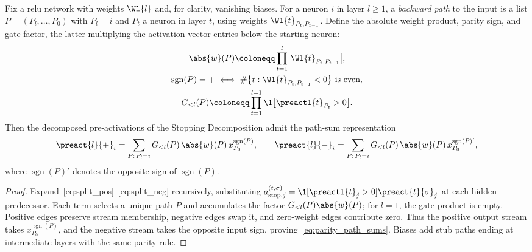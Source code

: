 \begin{lemmaenv}\label{lem:parity_path}
Fix a \ac{relu} network with weights $\Wl{l}$ and, for clarity, vanishing biases. For a neuron $i$ in layer $l \ge 1$, a \emph{backward path} to the input is a list $P = (P_l, \dots, P_0)$ with $P_l = i$ and $P_t$ a neuron in layer $t$, using weights $\Wl{t}_{P_t, P_{t-1}}$. Define the absolute weight product, parity sign, and gate factor, the latter multiplying the activation-vector entries below the starting neuron:
\begin{equation*}
\begin{gathered}
	\abs{w}(P) \coloneqq \prod_{t=1}^{l} \bigl|\Wl{t}_{P_t, P_{t-1}}\bigr|,
\\
\operatorname{sgn}(P) = + \iff \#\bigl\{ t : \Wl{t}_{P_t, P_{t-1}} < 0 \bigr\}
    \text{ is even},
\\
	G_{<l}(P) \coloneqq \prod_{t=1}^{l-1} \1\bigl[\preactl{t}_{P_t} > 0\bigr].
\end{gathered}
\end{equation*}
Then the decomposed pre-activations of the Stopping Decomposition admit the path-sum representation
\begin{equation}
	\preact{l}{+}_i = \sum_{P :\, P_l = i} G_{<l}(P)\, \abs{w}(P)\, x_{P_0}^{\operatorname{sgn}(P)},
	\qquad
	\preact{l}{-}_i = \sum_{P :\, P_l = i} G_{<l}(P)\, \abs{w}(P)\, x_{P_0}^{\operatorname{sgn}(P)'},
	\label{eq:parity_path_sums}
\end{equation}
where $\operatorname{sgn}(P)' $ denotes the opposite sign of $\operatorname{sgn}(P)$.\end{lemmaenv}

\begin{proof}
Expand~\eqref{eq:split_pos}--\eqref{eq:split_neg} recursively, substituting $a_{\mathrm{stop},j}^{(t,\sigma)}=\1[\preactl{t}_j>0]\preact{t}{\sigma}_j$ at each hidden predecessor. Each term selects a unique path $P$ and accumulates the factor $G_{<l}(P)\abs{w}(P)$; for $l=1$, the gate product is empty. Positive edges preserve stream membership, negative edges swap it, and zero-weight edges contribute zero. Thus the positive output stream takes $x_{P_0}^{\operatorname{sgn}(P)}$, and the negative stream takes the opposite input sign, proving~\eqref{eq:parity_path_sums}. Biases add stub paths ending at intermediate layers with the same parity rule.
\end{proof}

